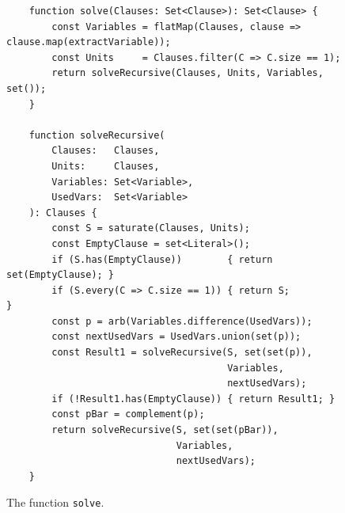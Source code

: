 \begin{figure}[!ht]
  \centering
\begin{verbatim}
    function solve(Clauses: Set<Clause>): Set<Clause> {
        const Variables = flatMap(Clauses, clause => clause.map(extractVariable));
        const Units     = Clauses.filter(C => C.size == 1);
        return solveRecursive(Clauses, Units, Variables, set());
    }

    function solveRecursive(
        Clauses:   Clauses,
        Units:     Clauses,
        Variables: Set<Variable>,
        UsedVars:  Set<Variable>
    ): Clauses {
        const S = saturate(Clauses, Units);
        const EmptyClause = set<Literal>();
        if (S.has(EmptyClause))        { return set(EmptyClause); }
        if (S.every(C => C.size == 1)) { return S;                }
        const p = arb(Variables.difference(UsedVars));
        const nextUsedVars = UsedVars.union(set(p));
        const Result1 = solveRecursive(S, set(set(p)),
                                       Variables,
                                       nextUsedVars);
        if (!Result1.has(EmptyClause)) { return Result1; }
        const pBar = complement(p);
        return solveRecursive(S, set(set(pBar)),
                              Variables,
                              nextUsedVars);
    }
\end{verbatim}
\vspace*{-0.3cm}
  \caption{The function \texttt{solve}.}
  \label{fig:solve}
\end{figure}

